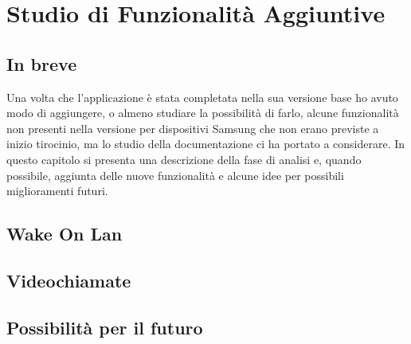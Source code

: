 \chapter{Studio di Funzionalità Aggiuntive}

\section{In breve}
Una volta che l'applicazione è stata completata nella sua versione base ho avuto modo di aggiungere, o almeno studiare la possibilità di farlo, alcune funzionalità non presenti nella versione per dispositivi Samsung che non erano previste a inizio tirocinio, ma lo studio della documentazione ci ha portato a considerare.
In questo capitolo si presenta una descrizione della fase di analisi e, quando possibile, aggiunta delle nuove funzionalità e alcune idee per possibili miglioramenti futuri.

\section{Wake On Lan}
\section{Videochiamate}
\section{Possibilità per il futuro} \label{future_implementazioni}